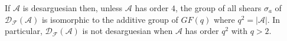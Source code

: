 If $\mathcal{A}$ is desarguesian then, unless $\mathcal{A}$ has order $4$, the group of all shears $\sigma_a$ of $\mathcal{D}_{\mathcal{F}}(\mathcal{A})$ is isomorphic to the additive group of $GF(q)$ where $q^2=|\mathcal{A}|$. In particular, $\mathcal{D}_{\mathcal{F}}(\mathcal{A})$ is not desarguesian when $\mathcal{A}$ has order $q^2$ with $q>2$.

